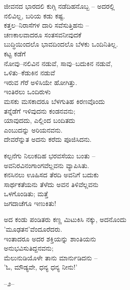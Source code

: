 \begin{myquote}
ಜೀವನದ ಭಾರದಲಿ ಕುಗ್ಗಿ ನಡೆದಿಹನೊಬ್ಬ – ಅದರಲ್ಲಿ\\ನಲಿವಿಲ್ಲ, ಬರಿಯ ಕಡು ಕಷ್ಟ.\\ಕತ್ತಲ–ನಿರಾಸೆಗಳ ದಾರಿ ಸವೆಸುತ್ತಿಹನು –\\ಚಣಕಾಲವಾದರೂ ಸಂತಸವನೀವುದಕೆ\\ಬುದ್ಧಿಯಿಂದಲೊ ಭಾವದಿಂದಲೊ ಬೆಳಕು ಒಂದಿನಿತಿಲ್ಲ.\\ಕಟ್ಟ ಕಡೆಗೆ\\ನೋವು–ನಲಿವಿನ ನಡುವೆ, ಸಾವು–ಬದುಕಿನ ನಡುವೆ,\\ಒಳಿತು–ಕೆಡುಕಿನ ನಡುವೆ\\ಇರುವ ಗೆರೆ ಅಳಿಸಿಯೇ ಹೋಗಿತ್ತು.\\ಇಂತಿರಲು ಒಂದಿರುಳು\\ಮಸಕು ಮಸಕಾದರೂ ಬೆಳಗುತಿಹ ಕಿರಣವೊಂದು\\ತನ್ನೆಡೆಗೆ ಇಳಿವುದನು ಕಂಡನವನು;\\ಯಾವುದದು, ಎಲ್ಲಿಂದ ಬಂದಿತದು\\ಎಂಬುದನ್ನು ಅರಿಯನವನು.\\ದೇವರೆನ್ನುತ ಅದನು ಕರೆದು ಪೂಜಿಸಿದನು.
\end{myquote}

\begin{myquote}
ಕಲ್ಪನೆಗು ನಿಲುಕದಿಹ ಭರವಸೆಯು ಬಂತು –\\ಅವನಿರವಿನಂಗಾಂಗವೆಲ್ಲವನು ವ್ಯಾಪಿಸಿತು.\\ಕನಸಿನಲು ಊಹಿಸದ ತೆರದಿ ಅವನಿಗೆ ಬದುಕು\\ಸಾರ್ಥಕತೆಯನು ತೆಳೆದು ಅವನ ತಿಳಿವೆಲ್ಲವನು\\ಒಳಗೊಂಡಿತು; ಮತ್ತೆ\\ಜಗದಾಚೆಗೂ ಇಣುಕಿತು!
\end{myquote}

\begin{myquote}
ಅದ ಕಂಡು ಪಂಡಿತರು ಕಣ್ಣ ಮಿಟುಕಿಸಿ ನಕ್ಕು, ಅದನೊಂದು\\'ಮೂಢತನ'ವೆಂದೂರೆದರು.\\ಇಂತಾದರೂ ಅದರ ಶಕ್ತಿಯನ್ನು ಶಾಂತಿಯನು\\ಅನುಭವಿಸುತಿದ್ದನವನು;\\ಮೆಲುನುಡಿಯೊಳೇ ತಾನು ಮಾರ್ನುಡಿದನು –\\'ಓ, ಮೌಡ್ಯವೇ, ಧನ್ಯ ಧನ್ಯ ನೀನು!'
\end{myquote}

\begin{center}
–೨–
\end{center}

